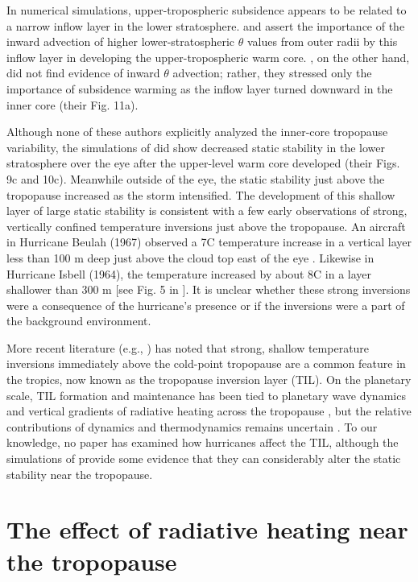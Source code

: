 In numerical simulations, upper-tropospheric subsidence appears to be related to a narrow inflow layer in the lower stratosphere.
\cite{ChenZhang2013} and \cite{ChenGopalakrishnan2015} assert the importance of the inward advection of higher lower-stratospheric $\theta$ values from outer radii by this inflow layer in developing the upper-tropospheric warm core.
\cite{Kieuetal2016}, on the other hand, did not find evidence of inward $\theta$ advection; rather, they stressed only the importance of subsidence warming as the inflow layer turned downward in the inner core (their Fig. 11a).

Although none of these authors explicitly analyzed the inner-core tropopause variability, the simulations of \cite{OhnoSatoh2015} did show decreased static stability in the lower stratosphere over the eye after the upper-level warm core developed (their Figs. 9c and 10c).
Meanwhile outside of the eye, the static stability just above the tropopause increased as the storm intensified.
The development of this shallow layer of large static stability is consistent with a few early observations of strong, vertically confined temperature inversions just above the tropopause.
An aircraft in Hurricane Beulah (1967) observed a 7\textdegree{}C temperature increase in a vertical layer less than 100 m deep just above the cloud top east of the eye \citep{Waco1970}.
Likewise in Hurricane Isbell (1964), the temperature increased by about 8\textdegree{}C in a layer shallower than 300 m [see Fig. 5 in \cite{Gentry1967}].
It is unclear whether these strong inversions were a consequence of the hurricane’s presence or if the inversions were a part of the background environment.

More recent literature (e.g., \citeauthor{Wirth2003} \citeyear{Wirth2003}) has noted that strong, shallow temperature inversions immediately above the cold-point tropopause are a common feature in the tropics, now known as the tropopause inversion layer (TIL).
On the planetary scale, TIL formation and maintenance has been tied to planetary wave dynamics \citep{Griseetal2010} and vertical gradients of radiative heating across the tropopause \citep{Randeletal2007}, but the relative contributions of dynamics and thermodynamics remains uncertain \citep{Ferreiraetal2016}.
To our knowledge, no paper has examined how hurricanes affect the TIL, although the simulations of \cite{OhnoSatoh2015} provide some evidence that they can considerably alter the static stability near the tropopause.

\section{The effect of radiative heating near the tropopause}

